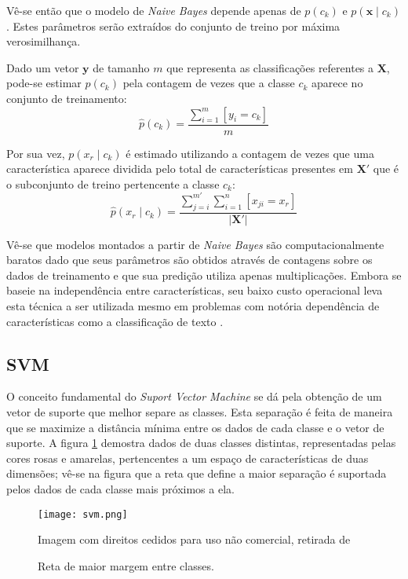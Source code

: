 Vê-se então que o modelo de \textit{Naive Bayes} depende apenas de $p(c_k)$ e $p(\mathbf{x} \mid c_k)$. Estes parâmetros serão extraídos do conjunto de treino por máxima verosimilhança.

Dado um vetor $\mathbf{y}$ de tamanho $m$ que representa as classificações referentes a $\mathbf{X}$, pode-se estimar $p(c_k)$ pela contagem de vezes que a classe $c_k$ aparece no conjunto de treinamento:
\begin{equation}
    \hat{p}(c_k) = \frac{\sum_{i=1}^m [y_i = c_k]}{m}
\end{equation}

Por sua vez, $p(x_r \mid c_k)$ é estimado utilizando a contagem de vezes que uma característica aparece dividida pelo total de características presentes em $\mathbf{X'}$ que é o subconjunto de treino pertencente a classe $c_k$:
\begin{equation}
    \hat{p}(x_r \mid c_k) = \frac{\sum_{j=i}^{m'} \sum_{i=1}^n [x_{ji} = x_r]}{|\mathbf{X'}|}
\end{equation}

Vê-se que modelos montados a partir de \textit{Naive Bayes} são computacionalmente baratos dado que seus parâmetros são obtidos através de contagens sobre os dados de treinamento e que sua predição utiliza apenas multiplicações.
Embora se baseie na independência entre características, seu baixo custo operacional leva esta técnica a ser utilizada mesmo em problemas com notória dependência de características como a classificação de texto \cite{mccallum98}.

\subsection{SVM}

O conceito fundamental do \textit{Suport Vector Machine} se dá pela obtenção de um vetor de suporte que melhor separe as classes. Esta separação é feita de maneira que se maximize a distância mínima entre os dados de cada classe e o vetor de suporte. A figura \ref{fig:svm} demostra dados de duas classes distintas, representadas pelas cores rosas e amarelas, pertencentes a um espaço de características de duas dimensões; vê-se na figura que a reta que define a maior separação é suportada pelos dados de cada classe mais próximos a ela.

\begin{figure}
\begin{center} {
    \begin{center}
    \texttt{[image: svm.png]}
    \caption{Reta de maior margem entre classes.}
    \small Imagem com direitos cedidos para uso não comercial, retirada de \cite{vanderplas15}
    \label{fig:svm}
    \end{center}
}
\end{center}
\end{figure}


